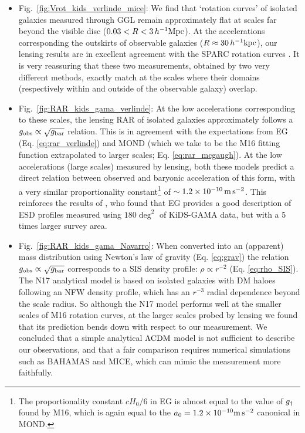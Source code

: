 \documentclass[usenatbib]{mnras}
\newcommand{\hkpc}{\, h^{-1}{\rm{kpc}} }
\newcommand{\hMpc}{\, h^{-1}{\rm{Mpc}} }
\newcommand{\mpss}{ {\rm m}\,{\rm s}^{-2} }
\newcommand{\lcdm}{{\rm \Lambda CDM}}
\newcommand*{\E}[1]{\times 10^{#1}}
\newcommand{\un}[1]{_{\rm #1}}
\begin{document}
\begin{itemize}

	\item Fig.~\ref{fig:Vrot_kids_verlinde_mice}: We find that `rotation curves' of isolated galaxies measured through GGL remain approximately flat at scales far beyond the visible disc ($0.03 < R < 3 \hMpc$). At the accelerations corresponding the outskirts of observable galaxies ($R \approx 30\hkpc$), our lensing results are in excellent agreement with the SPARC rotation curves \cite[]{lelli2016b}. It is very reassuring that these two measurements, obtained by two very different methods, exactly match at the scales where their domains (respectively within and outside of the observable galaxy) overlap.
	
	\item Fig.~\ref{fig:RAR_kids_gama_verlinde}: At the low accelerations corresponding to these scales, the lensing RAR of isolated galaxies approximately follows a $g\un{obs} \propto \sqrt{g\un{bar}}$ relation. This is in agreement with the expectations from EG (Eq. \ref{eq:rar_verlinde}) and MOND (which we take to be the M16 fitting function extrapolated to larger scales; Eq. \ref{eq:rar_mcgaugh}). At the low accelerations (large scales) measured by lensing, both these models predict a direct relation between observed and baryonic acceleration of this form, with a very similar proportionality constant\footnote{The proportionality constant $c H_0 / 6$ in EG is almost equal to the value of $g\un{\dagger}$ found by M16, which is again equal to the $a_0=1.2\E{-10} \mpss$ canonical in MOND.} of $\sim1.2\E{-10} \, \mpss$. This reinforces the results of \cite{brouwer2017}, who found that EG provides a good description of ESD profiles measured using $180 \deg^2$ of KiDS-GAMA data, but with a 5 times larger survey area.
	
	\item Fig.~\ref{fig:RAR_kids_gama_Navarro}: When converted into an (apparent) mass distribution using Newton's law of gravity (Eq. \ref{eq:grav}) the relation $g\un{obs} \propto \sqrt{g\un{bar}}$ corresponds to a SIS density profile: $\rho \propto r^{-2}$ (Eq. \ref{eq:rho_SIS}). The N17 analytical model is based on isolated galaxies with DM haloes following an NFW density profile, which has an $r^{-3}$ radial dependence beyond the scale radius. So although the N17 model performs well at the smaller scales of M16 rotation curves, at the larger scales probed by lensing we found that its prediction bends down with respect to our measurement. We concluded that a simple analytical $\lcdm$ model is not sufficient to describe our observations, and that a fair comparison requires numerical simulations such as BAHAMAS and MICE, which can mimic the measurement more faithfully.
	

\end{itemize}
\end{document}
